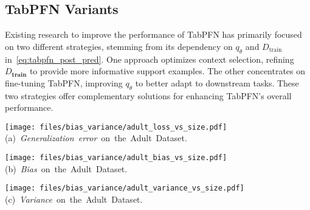 \subsection{TabPFN Variants} 
Existing research to improve the performance of TabPFN has primarily focused on two different strategies, stemming from its dependency on $q_{\theta}$ and \(D_{\text{train}}\) in~\autoref{eq:tabpfn_post_pred}. One approach optimizes context selection, refining \(D_{\textbf{train}}\) to provide more informative support examples. The other concentrates on fine-tuning TabPFN, improving \(q_{\theta}\) to better adapt to downstream tasks. These two strategies offer complementary solutions for enhancing TabPFN's overall performance. 
\begin{figure*}[h]
\centering
\begin{minipage}{0.32\textwidth}
    \centering
    \texttt{[image: files/bias\_variance/adult\_loss\_vs\_size.pdf]}
    {\scriptsize \mbox{(a) {\textit{Generalization error} on the Adult Dataset.}}}
    \label{fig:adult_generalization_error}
\end{minipage}%
\begin{minipage}{0.32\textwidth}
    \centering
    \texttt{[image: files/bias\_variance/adult\_bias\_vs\_size.pdf]}
    {\scriptsize \mbox{(b) {\textit{Bias} on the Adult Dataset.}}}
    \label{fig:adult_bias}
\end{minipage}%
\begin{minipage}{0.32\textwidth}
    \centering
    \texttt{[image: files/bias\_variance/adult\_variance\_vs\_size.pdf]}
    {\scriptsize \mbox{(c) {\textit{Variance} on the Adult Dataset.}}}
    \label{fig:adult_variance}
\end{minipage}



\end{figure*}
